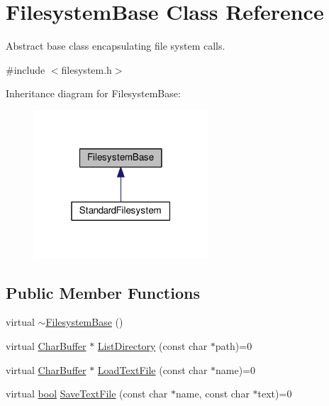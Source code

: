 \hypertarget{classFilesystemBase}{}\section{Filesystem\+Base Class Reference}
\label{classFilesystemBase}


Abstract base class encapsulating file system calls.  




{\ttfamily \#include $<$filesystem.\+h$>$}



Inheritance diagram for Filesystem\+Base\+:
\nopagebreak
\begin{figure}[H]
\begin{center}
\leavevmode
\includegraphics[width=184pt]{d0/d12/classFilesystemBase__inherit__graph}
\end{center}
\end{figure}
\subsection*{Public Member Functions}
\begin{DoxyCompactItemize}
\item 
virtual \hyperlink{classFilesystemBase_ad82ff955f62368b9e631f2a39a6f47d1}{$\sim$\+Filesystem\+Base} ()
\item 
virtual \hyperlink{classCharBuffer}{Char\+Buffer} $\ast$ \hyperlink{classFilesystemBase_a2f48a44b0b99b3c23e7c1a7587b5fc9c}{List\+Directory} (const char $\ast$path)=0
\item 
virtual \hyperlink{classCharBuffer}{Char\+Buffer} $\ast$ \hyperlink{classFilesystemBase_adc4a9e1dc189bcd221e3b994bc854d46}{Load\+Text\+File} (const char $\ast$name)=0
\item 
virtual \hyperlink{platform_8h_a1062901a7428fdd9c7f180f5e01ea056}{bool} \hyperlink{classFilesystemBase_a66b54f8151cd8903ac757207b062ef48}{Save\+Text\+File} (const char $\ast$name, const char $\ast$text)=0
\end{DoxyCompactItemize}


